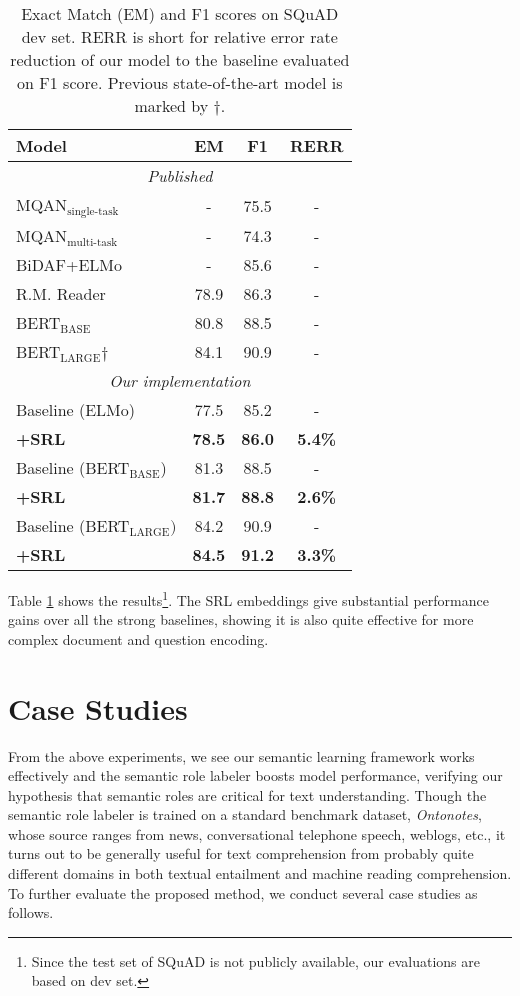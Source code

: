 \documentclass[11pt]{article}
\begin{document}
\begin{table}
	\centering
	
	{
		\begin{tabular}{l c c c}
			\hline
			
			\hline
			\textbf{Model}& \textbf{EM}& \textbf{F1} & \textbf{RERR} \\
			\hline
			\multicolumn{4}{c}{\emph{Published}} \\
			MQAN$_\text{single-task}$ & - & 75.5 &- \\
			MQAN$_\text{multi-task}$ & - & 74.3 &- \\
			BiDAF+ELMo & - &85.6 & -\\
			R.M. Reader & 78.9 & 86.3 & - \\
			BERT$_\text{BASE}$ & 80.8 & 88.5 & - \\
			BERT$_\text{LARGE}$$\dagger$ & 84.1 & 90.9 & - \\
			\hline
			\multicolumn{4}{c}{\emph{Our implementation}} \\
			Baseline (ELMo)& 77.5 & 85.2 & -\\
			\textbf{+SRL} &  \textbf{78.5} & \textbf{86.0} & \textbf{5.4\%}\\
			\hline
			Baseline (BERT$_\text{BASE}$)  &  81.3 &  88.5 & -\\
			\textbf{+SRL} &  \textbf{81.7} & \textbf{88.8} & \textbf{ 2.6\%}\\
			\hline
			Baseline (BERT$_\text{LARGE})$  & 84.2  & 90.9 & -\\
			\textbf{+SRL} &  \textbf{84.5} & \textbf{91.2} & \textbf{3.3\%}\\
			\hline
		\end{tabular}
	}
	
	\caption{\label{tab:squad} Exact Match (EM) and F1 scores on SQuAD dev set. RERR is short for relative error rate reduction of our model to the baseline evaluated on F1 score. Previous state-of-the-art model is marked by $\dagger$.}
\end{table}

Table \ref{tab:squad} shows the results\footnote{Since the test set of SQuAD is not publicly available, our evaluations are based on dev set.}. The SRL embeddings give substantial performance gains over all the strong baselines, showing it is also quite effective for more complex document and question encoding.


\section{Case Studies}
From the above experiments, we see our semantic learning framework works effectively and the semantic role labeler boosts model performance, verifying our hypothesis that semantic roles are critical for text understanding. Though the semantic role labeler is trained on a standard benchmark dataset, \emph{Ontonotes}, whose source ranges from news, conversational telephone speech, weblogs, etc., it turns out to be generally useful for text comprehension from probably quite different domains in both textual entailment and machine reading comprehension. To further evaluate the proposed method, we conduct several case studies as follows.
\end{document}
